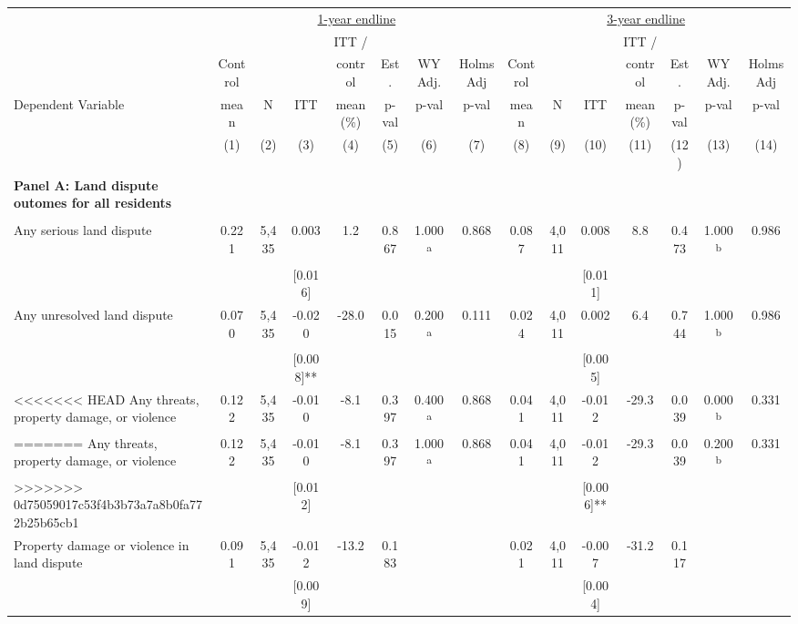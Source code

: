 \begin{tabular}{lcccccccccccccc}
\hline \noalign{\smallskip} & \multicolumn{7}{c}{\uline{\hfill 1-year endline \hfill}} & \multicolumn{7}{c}{\uline{\hfill 3-year endline \hfill}}\\
 &  &  &  & ITT / &  &  &  &  &  &  & ITT / &  &  & \\
 & Control &  &  & control & Est. & WY Adj. & Holms Adj & Control &  &  & control & Est. & WY Adj. & Holms Adj\\
Dependent Variable & mean & N & ITT & mean (\%) & p-val & p-val & p-val & mean & N & ITT & mean (\%) & p-val & p-val & p-val\\
 & (1) & (2) & (3) & (4) & (5) & (6) & (7) & (8) & (9) & (10) & (11) & (12) & (13) & (14)\\
\noalign{\smallskip}\hline \noalign{\smallskip}\textbf{Panel A: Land dispute outomes for all residents} &  &  &  &  &  &  &  &  &  &  &  &  &  & \\
 &  &  &  &  &  &  &  &  &  &  &  &  &  & \\
Any serious land dispute & 0.221 & 5,435 & 0.003 & 1.2 & 0.867 & 1.000\textsuperscript{a} & 0.868 & 0.087 & 4,011 & 0.008 & 8.8 & 0.473 & 1.000\textsuperscript{b} & 0.986\\
 &  &  & [0.016] &  &  &  &  &  &  & [0.011] &  &  &  & \\
Any unresolved land dispute & 0.070 & 5,435 & -0.020 & -28.0 & 0.015 & 0.200\textsuperscript{a} & 0.111 & 0.024 & 4,011 & 0.002 & 6.4 & 0.744 & 1.000\textsuperscript{b} & 0.986\\
 &  &  & [0.008]** &  &  &  &  &  &  & [0.005] &  &  &  & \\
<<<<<<< HEAD
Any threats, property damage, or violence & 0.122 & 5,435 & -0.010 & -8.1 & 0.397 & 0.400\textsuperscript{a} & 0.868 & 0.041 & 4,011 & -0.012 & -29.3 & 0.039 & 0.000\textsuperscript{b} & 0.331\\
=======
Any threats, property damage, or violence & 0.122 & 5,435 & -0.010 & -8.1 & 0.397 & 1.000\textsuperscript{a} & 0.868 & 0.041 & 4,011 & -0.012 & -29.3 & 0.039 & 0.200\textsuperscript{b} & 0.331\\
>>>>>>> 0d75059017c53f4b3b73a7a8b0fa772b25b65cb1
 &  &  & [0.012] &  &  &  &  &  &  & [0.006]** &  &  &  & \\
\quad Property damage or violence in land dispute & 0.091 & 5,435 & -0.012 & -13.2 & 0.183 &  &  & 0.021 & 4,011 & -0.007 & -31.2 & 0.117 &  & \\
 &  &  & [0.009] &  &  &  &  &  &  & [0.004] &  &  &  & \\

\end{tabular}
